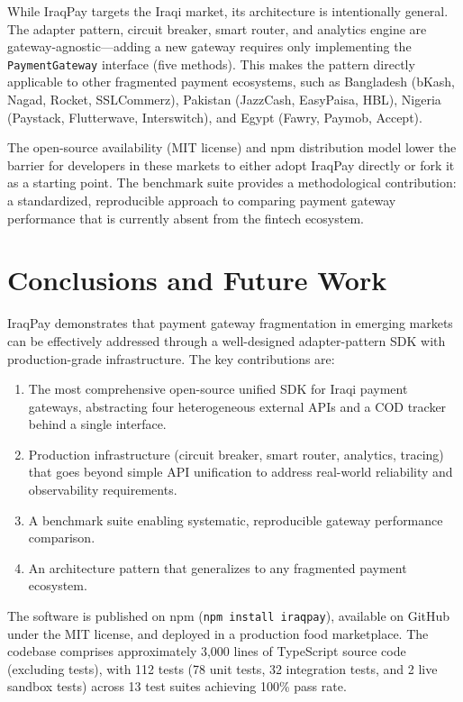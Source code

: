\documentclass[10pt, a4paper, oneside]{article}
\begin{document}
While IraqPay targets the Iraqi market, its architecture is intentionally general. The adapter pattern, circuit breaker, smart router, and analytics engine are gateway-agnostic---adding a new gateway requires only implementing the \texttt{PaymentGateway} interface (five methods). This makes the pattern directly applicable to other fragmented payment ecosystems, such as Bangladesh (bKash, Nagad, Rocket, SSLCommerz), Pakistan (JazzCash, EasyPaisa, HBL), Nigeria (Paystack, Flutterwave, Interswitch), and Egypt (Fawry, Paymob, Accept).

The open-source availability (MIT license) and npm distribution model lower the barrier for developers in these markets to either adopt IraqPay directly or fork it as a starting point. The benchmark suite provides a methodological contribution: a standardized, reproducible approach to comparing payment gateway performance that is currently absent from the fintech ecosystem.

\section{Conclusions and Future Work}

IraqPay demonstrates that payment gateway fragmentation in emerging markets can be effectively addressed through a well-designed adapter-pattern SDK with production-grade infrastructure. The key contributions are:

\begin{enumerate}
\item The most comprehensive open-source unified SDK for Iraqi payment gateways, abstracting four heterogeneous external APIs and a COD tracker behind a single interface.
\item Production infrastructure (circuit breaker, smart router, analytics, tracing) that goes beyond simple API unification to address real-world reliability and observability requirements.
\item A benchmark suite enabling systematic, reproducible gateway performance comparison.
\item An architecture pattern that generalizes to any fragmented payment ecosystem.
\end{enumerate}

The software is published on npm (\texttt{npm install iraqpay}), available on GitHub under the MIT license, and deployed in a production food marketplace. The codebase comprises approximately 3,000 lines of TypeScript source code (excluding tests), with 112 tests (78 unit tests, 32 integration tests, and 2 live sandbox tests) across 13 test suites achieving 100\% pass rate.
\end{document}
